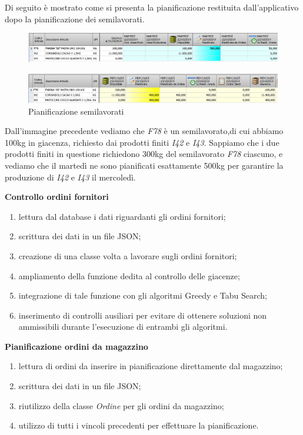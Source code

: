 Di seguito è mostrato come si presenta la pianificazione restituita dall'applicativo dopo la pianificazione dei semilavorati.

\begin{figure}[H]
	\includegraphics[width=\textwidth]{immagini/sl_planning.png}
	\centering
\end{figure}
\begin{figure}[H]
	\includegraphics[width=\textwidth]{immagini/sl_planning2.png}
    \centering
    \caption{Pianificazione semilavorati}
\end{figure}

Dall'immagine precedente vediamo che \textit{F78} è un semilavorato,di cui abbiamo 100kg in giacenza, richiesto dai prodotti finiti \textit{I42} e \textit{I43}.
Sappiamo che i due prodotti finiti in questione richiedono 300kg del semilavorato \textit{F78} ciascuno, e vediamo che il martedì ne sono pianificati esattamente 500kg
per garantire la produzione di \textit{I42} e \textit{I43} il mercoledì.

\newpage

\textbf{Controllo ordini fornitori} 
\begin{enumerate}
        \item lettura dal database i dati riguardanti gli ordini fornitori; 
        \item scrittura dei dati in un file JSON;
        \item creazione di una classe volta a lavorare sugli ordini fornitori;
        \item ampliamento della funzione dedita al controllo delle giacenze;
        \item integrazione di tale funzione con gli algoritmi Greedy e Tabu Search;
        \item inserimento di controlli ausiliari per evitare di ottenere soluzioni non ammissibili durante l'esecuzione di entrambi gli algoritmi.\\
\end{enumerate}

\textbf{Pianificazione ordini da magazzino} 
\begin{enumerate}
        \item lettura di ordini da inserire in pianificazione direttamente dal magazzino;
        \item scrittura dei dati in un file JSON;
        \item riutilizzo della classe \textit{Ordine} per gli ordini da magazzino;
        \item utilizzo di tutti i vincoli precedenti per effettuare la pianificazione.\\
\end{enumerate}


